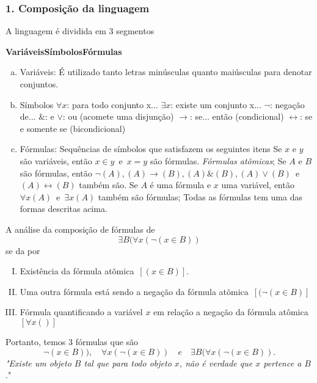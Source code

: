       \subsubsection*{1. Composição da linguagem}
         A linguagem é dividida em 3 segmentos
         \begin{center}
            \textbf{Variáveis}\quad \textbf{Símbolos}\quad \textbf{Fórmulas} 
         \end{center}
         \begin{enumerate}[a)]
            \item Variáveis: É utilizado tanto letras minúsculas quanto maiúsculas para denotar conjuntos.
            \item Símbolos  
               \subitem $\forall x$: para todo conjunto x...
               \subitem $\exists x$: existe um conjunto x...
               \subitem $\neg$: negação de...
               \subitem $\&$: e
               \subitem $\lor$: ou (acomete uma disjunção)
               \subitem $\rightarrow$: se... então (condicional)
               \subitem $\leftrightarrow$: se e somente se (bicondicional)
            \item Fórmulas: Sequências de símbolos que satisfazem os seguintes itens
               \subitem Se $x$ e $y$ são variáveis, então $x \in y$\ e\ $x = y$ são fórmulas. \textit{Fórmulas atômicas};
               \subitem Se $A$ e $B$ são fórmulas, então $\neg(A), (A) \rightarrow (B), (A) \& (B), (A) \lor (B)$\ e\ $(A) \leftrightarrow (B)$ também são.
               \subitem Se $A$ é uma fórmula e $x$ uma variável, então $\forall x(A)$\ e\ $\exists x(A)$ também são fórmulas;
               \subitem Todas as fórmulas tem uma das formas descritas acima.
         \end{enumerate}
         \begin{exmp}
            A análise da composição de fórmulas de
            $$\exists B(\forall x(\neg(x \in B))$$
            se da por
            \begin{enumerate}[I.]
               \item Existência da fórmula atõmica\ $[(x \in B)]$.
               \item Uma outra fórmula está sendo a negação da fórmula atõmica\ $[(\neg(x \in B)]$
               \item Fórmula quantificando a variável $x$ em relação a negação da fórmula atômica\ $[\forall x()]$
            \end{enumerate}
            Portanto, temos 3 fórmulas que são $$\neg(x \in B)),\quad \forall x(\neg(x \in B)) \quad e\quad \exists B (\forall x(\neg(x \in B)).$$
            \textit{"Existe um objeto $B$ tal que para todo objeto $x$, não é verdade que $x$ pertence a $B$}."
         \end{exmp}

